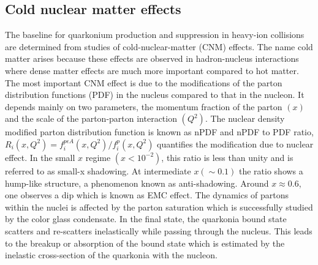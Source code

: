 


\subsection{Cold nuclear matter effects}

The baseline for quarkonium production and suppression in heavy-ion collisions 
are determined from studies of cold-nuclear-matter (CNM) effects. The name cold matter 
arises because these effects are observed in hadron-nucleus interactions 
where dense matter effects are much more important compared to hot matter.
The most important CNM effect is due to the modifications of the parton distribution
functions (PDF) in the nucleus compared to that in the nucleon.
It depends mainly on two parameters, 
the momentum fraction of the parton $(x)$ and the scale of the parton-parton 
interaction $(Q^2)$. The nuclear density modified parton distribution
function is known as nPDF and nPDF to PDF ratio,
$R_i(x,Q^2)=f_i^{p \epsilon A} (x, Q^2) /f_i^p  (x, Q^2)$
quantifies the modification due to nuclear effect. 
In the small $x$ regime $(x < 10^{-2})$, this ratio is less than unity
and is referred to as small-x shadowing. At intermediate  $x(\sim 0.1)$
the ratio shows a hump-like structure, a phenomenon known as 
anti-shadowing. Around $x\approx 0.6$, one observes a dip which is known as EMC
effect. The dynamics of partons 
within the nuclei is affected by the parton saturation which is successfully
studied by the color glass condensate. In the 
final state, the quarkonia bound state scatters and re-scatters inelastically
while passing through the nucleus. This leads to 
the breakup or absorption of the bound state which is estimated by the
inelastic cross-section of the quarkonia with the nucleon. 

